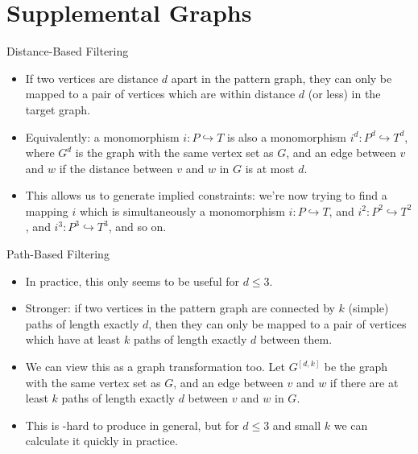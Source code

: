 \documentclass{beamer}
\begin{document}
\section{Supplemental Graphs}

\begin{frame}{Distance-Based Filtering}

    \begin{itemize}
        \item If two vertices are distance $d$ apart in the pattern graph, they can only be mapped
            to a pair of vertices which are within distance $d$ (or less) in the target graph.

        \item Equivalently: a monomorphism $i : P \hookrightarrow T$ is also a monomorphism $i^d
            : P^d \hookrightarrow T^d$, where $G^d$ is the graph with the same vertex set as
            $G$, and an edge between $v$ and $w$ if the distance between $v$ and $w$ in $G$ is
            at most $d$.

        \item This allows us to generate implied constraints: we're now trying to find a
            mapping $i$ which is simultaneously a monomorphism $i : P \hookrightarrow T$, and
            $i^2 : P^2 \hookrightarrow T^2$, and $i^3 : P^3 \hookrightarrow T^3$, and so on.
    \end{itemize}
\end{frame}

\begin{frame}{Path-Based Filtering}
    \begin{itemize}
        \item In practice, this only seems to be useful for $d \le 3$.

        \item Stronger: if two vertices in the pattern graph are connected by $k$ (simple) paths of
            length exactly $d$, then they can only be mapped to a pair of vertices which have at
            least $k$ paths of length exactly $d$ between them.

        \item We can view this as a graph transformation too. Let $G^{\left[d, k\right]}$ be the
            graph with the same vertex set as $G$, and an edge between $v$ and $w$ if there are at
            least $k$ paths of length exactly $d$ between $v$ and $w$ in $G$.

        \item This is \NP-hard to produce in general, but for $d \le 3$ and small $k$ we can
            calculate it quickly in practice.
    \end{itemize}
\end{frame}
\end{document}
